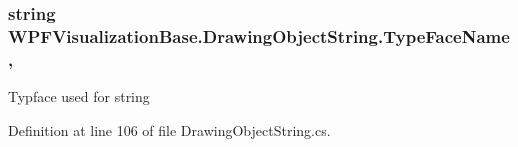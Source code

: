 \subsubsection[{\texorpdfstring{Type\+Face\+Name}{TypeFaceName}}]{\setlength{\rightskip}{0pt plus 5cm}string W\+P\+F\+Visualization\+Base.\+Drawing\+Object\+String.\+Type\+Face\+Name\hspace{0.3cm}{\ttfamily [get]}, {\ttfamily [set]}}\hypertarget{class_w_p_f_visualization_base_1_1_drawing_object_string_a84a168df70cd2db73b9bc73bcd3d026b}{}\label{class_w_p_f_visualization_base_1_1_drawing_object_string_a84a168df70cd2db73b9bc73bcd3d026b}


Typface used for string 



Definition at line 106 of file Drawing\+Object\+String.\+cs.

